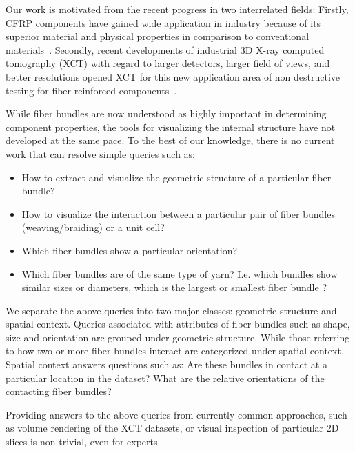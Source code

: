 Our work is motivated from the recent progress in two interrelated fields: Firstly, CFRP components have gained wide application in industry because of its superior material and physical properties in comparison to conventional materials~\cite{Karpat2012}. Secondly, recent developments of industrial 3D X-ray computed tomography (XCT) with regard to larger detectors, larger field of views, and better resolutions opened XCT for this new application area of non destructive testing for fiber reinforced components~\cite{Schilling2005}. 

While fiber bundles are now understood as highly important in determining component properties, the tools for visualizing the internal structure have not developed at the same pace.
To the best of our knowledge, there is no current work that can resolve simple queries such as:
\begin{itemize}[noitemsep]
	\item{ How to extract and visualize the geometric structure of a particular fiber bundle?}
	\item{ How to visualize the interaction between a particular pair of fiber bundles (weaving/braiding) or a unit cell?}
	\item{ Which fiber bundles show a particular orientation? }
	\item{ Which fiber bundles are of the same type of yarn? I.e. which bundles show similar sizes or diameters, which is the largest or smallest fiber bundle ?}
\end{itemize}
{We separate the above queries into two major classes: geometric structure and spatial context. 
Queries associated with attributes of fiber bundles such as shape, size and orientation are grouped under geometric structure. While those referring to how two or more fiber bundles interact are categorized under spatial context. Spatial context answers questions such as: Are these bundles in contact at a particular location in the dataset? What are the relative orientations of the contacting fiber bundles?

Providing answers to the above queries from currently common approaches, such as volume rendering of the XCT datasets, or  visual inspection of particular 2D slices is non-trivial, even for experts.}

